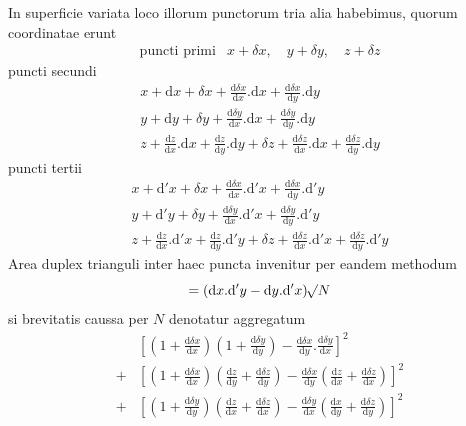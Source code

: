 In superficie variata loco illorum punctorum tria alia habebimus, quorum coordinatae erunt
\[
\begin{array}{ll}
\text{puncti primi}&x+\delta x,\quad y+\delta y,\quad z+\delta z
\end{array}
\]
puncti secundi
\[
\begin{gathered}
x+\mathrm{d}x+\delta x+\frac{\mathrm{d}\delta x}{\mathrm{d}x}.\mathrm{d}x+\frac{\mathrm{d}\delta x}{\mathrm{d}y}.\mathrm{d}y\\
y+\mathrm{d}y+\delta y+\frac{\mathrm{d}\delta y}{\mathrm{d}x}.\mathrm{d}x+\frac{\mathrm{d}\delta y}{\mathrm{d}y}.\mathrm{d}y\\
z+\frac{\mathrm{d}z}{\mathrm{d}x}.\mathrm{d}x+\frac{\mathrm{d}z}{\mathrm{d}y}.\mathrm{d}y+\delta z+\frac{\mathrm{d}\delta z}{\mathrm{d}x}.\mathrm{d}x+\frac{\mathrm{d}\delta z}{\mathrm{d}y}.\mathrm{d}y
\end{gathered}
\]
puncti tertii
\[
\begin{gathered}
x+\mathrm{d}'x+\delta x+\frac{\mathrm{d}\delta x}{\mathrm{d}x}.\mathrm{d}'x+\frac{\mathrm{d}\delta x}{\mathrm{d}y}.\mathrm{d}'y\\
y+\mathrm{d}'y+\delta y+\frac{\mathrm{d}\delta y}{\mathrm{d}x}.\mathrm{d}'x+\frac{\mathrm{d}\delta y}{\mathrm{d}y}.\mathrm{d}'y\\
z+\frac{\mathrm{d}z}{\mathrm{d}x}.\mathrm{d}'x+\frac{\mathrm{d}z}{\mathrm{d}y}.\mathrm{d}'y+\delta z+\frac{\mathrm{d}\delta z}{\mathrm{d}x}.\mathrm{d}'x+\frac{\mathrm{d}\delta z}{\mathrm{d}y}.\mathrm{d}'y
\end{gathered}
\]
Area duplex trianguli inter haec puncta invenitur per eandem methodum
\[
=(\mathrm{d}x.\mathrm{d}'y-\mathrm{d}y.\mathrm{d}'x)\mathord{{}^{}\!\surd}N
\]
si brevitatis caussa per $N$ denotatur aggregatum
\[
\begin{aligned}
&[(1+\frac{\mathrm{d}\delta x}{\mathrm{d}x})(1+\frac{\mathrm{d}\delta y}{\mathrm{d}y})-\frac{\mathrm{d}\delta x}{\mathrm{d}y}.\frac{\mathrm{d}\delta y}{\mathrm{d}x}]^2\\
+&[(1+\frac{\mathrm{d}\delta x}{\mathrm{d}x})(\frac{\mathrm{d}z}{\mathrm{d}y}+\frac{\mathrm{d}\delta z}{\mathrm{d}y})-\frac{\mathrm{d}\delta x}{\mathrm{d}y}(\frac{\mathrm{d}z}{\mathrm{d}x}+\frac{\mathrm{d}\delta z}{\mathrm{d}x})]^2\\
+&[(1+\frac{\mathrm{d}\delta y}{\mathrm{d}y})(\frac{\mathrm{d}z}{\mathrm{d}x}+\frac{\mathrm{d}\delta z}{\mathrm{d}x})-\frac{\mathrm{d}\delta y}{\mathrm{d}x}(\frac{\mathrm{d}x}{\mathrm{d}y}+\frac{\mathrm{d}\delta z}{\mathrm{d}y})]^2
\end{aligned}
\]
